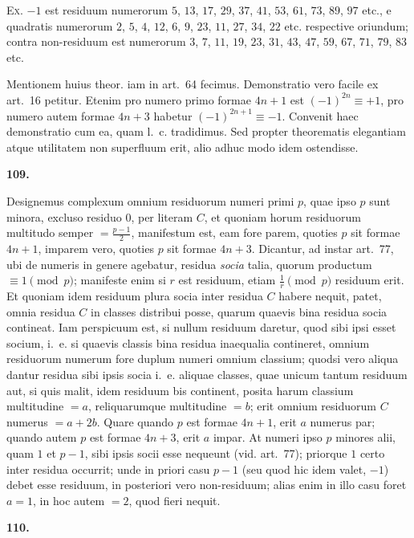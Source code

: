 \documentclass[12pt,a4paper]{article}
\theoremstyle{plain}
\theoremstyle{definition}
\theoremstyle{remark}
\begin{document}
\textsc{Ex.} $-1$ est residuum numerorum $5$, $13$, $17$, $29$, $37$, $41$, $53$, $61$, $73$, $89$, $97$ etc., e quadratis numerorum $2$, $5$, $4$, $12$, $6$, $9$, $23$, $11$, $27$, $34$, $22$ etc. respective oriundum; contra non-residuum est numerorum $3$, $7$, $11$, $19$, $23$, $31$, $43$, $47$, $59$, $67$, $71$, $79$, $83$ etc.

Mentionem huius theor. iam in art.~64 fecimus. Demonstratio vero facile ex art.~16 petitur. Etenim pro numero primo formae $4n+1$ est $(-1)^{2n} \equiv +1$, pro numero autem formae $4n+3$ habetur $(-1)^{2n+1} \equiv -1$. Convenit haec demonstratio cum ea, quam l.~c. tradidimus. Sed propter theorematis elegantiam atque utilitatem non superfluum erit, alio adhuc modo idem ostendisse.

\setcounter{satz}{109}
\addtocounter{satz}{-1}
\textbf{109.}

Designemus complexum omnium residuorum numeri primi $p$, quae ipso $p$ sunt minora, excluso residuo $0$, per literam $C$, et quoniam horum residuorum multitudo semper $=\frac{p-1}{2}$, manifestum est, eam fore parem, quoties $p$ sit formae $4n+1$, imparem vero, quoties $p$ sit formae $4n+3$. Dicantur, ad instar art.~77, ubi de numeris in genere agebatur, residua \emph{socia} talia, quorum productum $\equiv 1 \pmod{p}$; manifeste enim si $r$ est residuum, etiam $\frac{1}{r} \pmod{p}$ residuum erit. Et quoniam idem residuum plura socia inter residua $C$ habere nequit, patet, omnia residua $C$ in classes distribui posse, quarum quaevis bina residua socia contineat. Iam perspicuum est, si nullum residuum daretur, quod sibi ipsi esset socium, i.~e. si quaevis classis bina residua inaequalia contineret, omnium residuorum numerum fore duplum numeri omnium classium; quodsi vero aliqua dantur residua sibi ipsis socia i.~e. aliquae classes, quae unicum tantum residuum aut, si quis malit, idem residuum bis continent, posita harum classium multitudine $=a$, reliquarumque multitudine $=b$; erit omnium residuorum $C$ numerus $=a+2b$. Quare quando $p$ est formae $4n+1$, erit $a$ numerus par; quando autem $p$ est formae $4n+3$, erit $a$ impar. At numeri ipso $p$ minores alii, quam $1$ et $p-1$, sibi ipsis socii esse nequeunt (vid. art.~77); priorque $1$ certo inter residua occurrit; unde in priori casu $p-1$ (seu quod hic idem valet, $-1$) debet esse residuum, in posteriori vero non-residuum; alias enim in illo casu foret $a=1$, in hoc autem $=2$, quod fieri nequit.

\setcounter{satz}{110}
\addtocounter{satz}{-1}
\textbf{110.}
\end{document}
